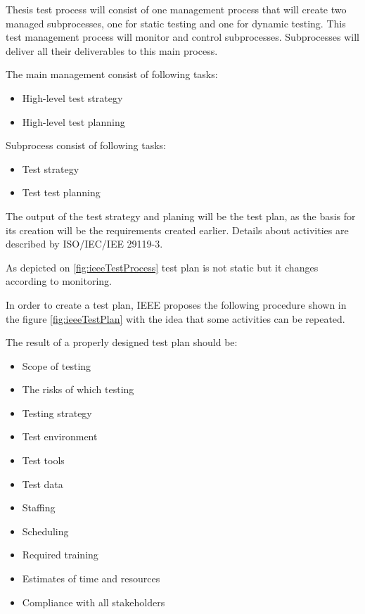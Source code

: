 
Thesis test process will consist of one management process that will create two managed subprocesses, one for static testing and one for dynamic testing. This test management process will monitor and control subprocesses. Subprocesses will deliver all their deliverables to this main process.

The main management consist of following tasks:
\begin{itemize}
  \item High-level test strategy
  \item High-level test planning
\end{itemize}

Subprocess consist of following tasks:
\begin{itemize}
  \item Test strategy
  \item Test test planning
\end{itemize}

The output of the test strategy and planing will be the test plan, as the basis for its creation will be the requirements created earlier. Details about activities are described by ISO/IEC/IEE 29119-3.

As depicted on \ref{fig:ieeeTestProcess} test plan is not static but it changes according to monitoring.


In order to create a test plan, IEEE proposes the following procedure shown in the figure \ref{fig:ieeeTestPlan} with the idea that some activities can be repeated.

The result of a properly designed test plan should be:
\begin{itemize}
  \item Scope of testing
  \item The risks of which testing
  \item Testing strategy
  \item Test environment
  \item Test tools
  \item Test data
  \item Staffing
  \item Scheduling
  \item Required training
  \item Estimates of time and resources
  \item Compliance with all stakeholders
\end{itemize}

